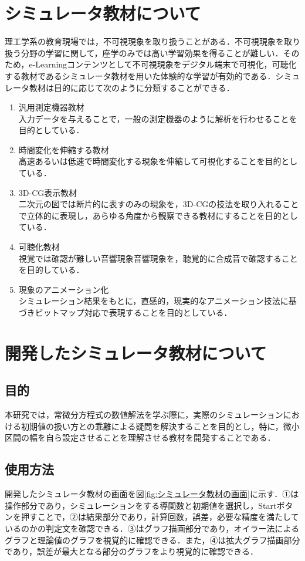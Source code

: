 \documentclass[a4paper, 12pt]{ltjsarticle}
\begin{document}
\section{シミュレータ教材について}
理工学系の教育現場では，不可視現象を取り扱うことがある．不可視現象を取り扱う分野の学習に関して，座学のみでは高い学習効果を得ることが難しい．そのため，e-Learningコンテンツとして不可視現象をデジタル端末で可視化，可聴化する教材であるシミュレータ教材を用いた体験的な学習が有効的である．シミュレータ教材は目的に応じて次のように分類することができる．
\begin{enumerate}[label=(\alph*)]
\item 汎用測定機器教材\\
入力データを与えることで，一般の測定機器のように解析を行わせることを目的としている．
\item 時間変化を伸縮する教材\\
高速あるいは低速で時間変化する現象を伸縮して可視化することを目的としている．
\item 3D-CG表示教材\\
二次元の図では断片的に表すのみの現象を，3D-CGの技法を取り入れることで立体的に表現し，あらゆる角度から観察できる教材にすることを目的としている．
\item 可聴化教材\\
視覚では確認が難しい音響現象音響現象を，聴覚的に合成音で確認することを目的している．
\item 現象のアニメーション化\\
シミュレーション結果をもとに，直感的，現実的なアニメーション技法に基づきビットマップ対応で表現することを目的としている．
\end{enumerate}
\clearpage
\section{開発したシミュレータ教材について}
\subsection{目的}
本研究では，常微分方程式の数値解法を学ぶ際に，実際のシミュレーションにおける初期値の扱い方との乖離による疑問を解決することを目的とし，特に，微小区間の幅を自ら設定させることを理解させる教材を開発することである．
\subsection{使用方法}
開発したシミュレータ教材の画面を図\ref{fig:シミュレータ教材の画面}に示す．①は操作部分であり，シミュレーションをする導関数と初期値を選択し，Startボタンを押すことで，②は結果部分であり，計算回数，誤差，必要な精度を満たしているのかの判定文を確認できる．③はグラフ描画部分であり，オイラー法によるグラフと理論値のグラフを視覚的に確認できる．また，④は拡大グラフ描画部分であり，誤差が最大となる部分のグラフをより視覚的に確認できる．
\end{document}
